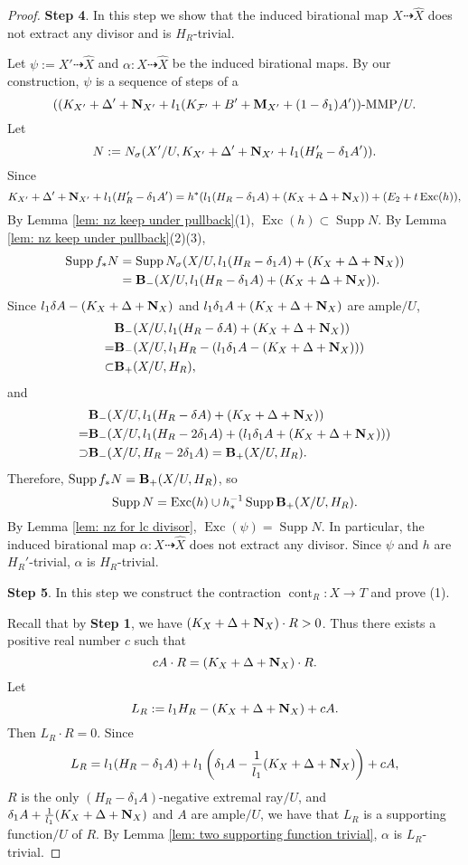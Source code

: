 \documentclass[11pt]{amsart}
\numberwithin{equation}{section}
\newcommand{\Mm}{{\bf{M}}}
\newcommand{\Nn}{{\bf{N}}}
\newcommand{\Exc}{\operatorname{Exc}}
\newcommand{\Supp}{\operatorname{Supp}}
\newcommand{\cont}{\operatorname{cont}}
\newcommand{\Bb}{{\bf{B}}}
\newcommand{\Ff}{\mathcal{F}}
\theoremstyle{definition}
\theoremstyle{definition}
\theoremstyle{definition}
\begin{document}
\begin{proof}
\medskip

\noindent\textbf{Step 4}. In this step we show that the induced birational map $X\dashrightarrow\widehat X$ does not extract any divisor and is $H_R$-trivial.

Let $\psi:=X'\dashrightarrow\widehat X$ and $\alpha: X\dashrightarrow\widehat X$ be the induced birational maps. By our construction, $\psi$ is a sequence of steps of a 
$$((K_{X'}+\Delta'+\Nn_{X'}+l_1(K_{\Ff'}+B'+\Mm_{X'}+(1-\delta_1)A'))\text{-MMP}/U.$$
Let $$N:=N_{\sigma}(X'/U,K_{X'}+\Delta'+\Nn_{X'}+l_1(H_R'-\delta_1 A')).$$ Since
$$K_{X'}+\Delta'+\Nn_{X'}+l_1(H_R'-\delta_1 A')=h^*(l_1(H_R-\delta_1 A)+(K_X+\Delta+\Nn_X))+(E_2+t\Exc(h)),$$
By Lemma \ref{lem: nz keep under pullback}(1), $\Exc(h)\subset\Supp N$. By Lemma \ref{lem: nz keep under pullback}(2)(3),
\begin{align*}
    \Supp f_*N&=\Supp N_{\sigma}(X/U,l_1(H_R-\delta_1 A)+(K_X+\Delta+\Nn_X))\\
    &=\Bb_-(X/U,l_1(H_R-\delta_1 A)+(K_X+\Delta+\Nn_X)).
\end{align*}
Since $l_1\delta A-(K_X+\Delta+\Nn_X)$ and  $l_1\delta_1 A+(K_X+\Delta+\Nn_X)$ are ample$/U$,
\begin{align*}
    &\Bb_-(X/U,l_1(H_R-\delta A)+(K_X+\Delta+\Nn_X))\\=&\Bb_-(X/U,l_1H_R-(l_1\delta_1 A-(K_X+\Delta+\Nn_X)))\\
    \subset&\Bb_+(X/U,H_R),
\end{align*}
and
\begin{align*}
   &\Bb_-(X/U,l_1(H_R-\delta A)+(K_X+\Delta+\Nn_X))\\
   =&\Bb_-(X/U,l_1(H_R-2\delta_1A)+(l_1\delta_1 A+(K_X+\Delta+\Nn_X)))\\
   \supset&\Bb_-(X/U,H_R-2\delta_1A)=\Bb_+(X/U,H_R).
\end{align*}
Therefore, $\Supp f_*N=\Bb_+(X/U,H_R)$, so 
$$\Supp N=\Exc(h)\cup h^{-1}_*\Supp\Bb_+(X/U,H_R).$$
By Lemma \ref{lem: nz for lc divisor}, $\Exc(\psi)=\Supp N$. In particular, the induced birational map $\alpha: X\dashrightarrow \widehat X$ does not extract any divisor. Since $\psi$ and $h$ are $H_R'$-trivial, $\alpha$ is $H_R$-trivial. 

\medskip

\noindent\textbf{Step 5}. In this step we construct the contraction $\cont_R: X\rightarrow T$ and prove (1).

Recall that by \textbf{Step 1}, we have $(K_X+\Delta+\Nn_X)\cdot R>0$. Thus there exists a positive real number $c$ such that
$$cA\cdot R=(K_X+\Delta+\Nn_X)\cdot R.$$
Let $$L_R:=l_1H_R-(K_X+\Delta+\Nn_X)+cA.$$ Then $L_R\cdot R=0$. Since
$$L_R=l_1(H_R-\delta_1A)+l_1\left(\delta_1A-\frac{1}{l_1}(K_X+\Delta+\Nn_X)\right)+cA,$$
$R$ is the only $(H_R-\delta_1A)$-negative extremal ray$/U$, and $\delta_1A+\frac{1}{l_1}(K_X+\Delta+\Nn_X)$ and $A$ are ample$/U$, we have that $L_R$ is a supporting function$/U$ of $R$.  By Lemma \ref{lem: two supporting function trivial}, $\alpha$ is $L_R$-trivial. 


\end{proof}
\end{document}
